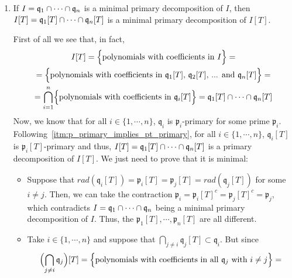 \begin{problem}
\begin{enumerate}[label=(\theproblem.\arabic*),ref=\theproblem.\arabic*]
        \item If $I = \mathfrak{q}_1 \cap \cdots \cap \mathfrak{q}_n$ is a minimal primary decomposition of $I$, then $I[T] = \mathfrak{q}_1[T] \cap \cdots \cap \mathfrak{q}_n[T]$ is a minimal primary decomposition of $I[T]$.
        \begin{sol}
            First of all we see that, in fact,
            \begin{gather*}
                I[T] = \Bigl\{ \text{polynomials with coefficients in } I \Bigr\} =\\
                = \Bigl\{ \text{polynomials with coefficients in } \mathfrak{q}_1[T] \text{, } \mathfrak{q}_2[T] \text{, ... and } \mathfrak{q}_n[T] \Bigr\} =\\
                = \bigcap_{i=1}^n \Bigl\{ \text{polynomials with coefficients in } \mathfrak{q}_i[T] \Bigr\} = \mathfrak{q}_1[T] \cap \cdots \cap \mathfrak{q}_n[T]\\
            \end{gather*}
            Now, we know that for all $i \in \{ 1, \cdots, n \}$, $\mathfrak{q}_i$ is $\mathfrak{p}_i$-primary for some prime $\mathfrak{p}_i$.
            Following~\ref{itm:p_primary_implies_pt_primary}, for all $i \in \{ 1, \cdots, n \}$, $\mathfrak{q}_i[T]$ is $\mathfrak{p}_i[T]$-primary and thus, $I[T] = \mathfrak{q}_1[T] \cap \cdots \cap \mathfrak{q}_n[T]$ is a primary decomposition of $I[T]$.
            We just need to prove that it is minimal:
            \begin{itemize}
                \item
                Suppose that $rad(\mathfrak{q}_i[T]) = \mathfrak{p}_i[T] = \mathfrak{p}_j[T] = rad(\mathfrak{q}_j[T])$ for some $i \neq j$.
                Then, we can take the contraction $\mathfrak{p}_i = \mathfrak{p}_i[T]^c = \mathfrak{p}_j[T]^c = \mathfrak{p}_j$, which contradicts $I = \mathfrak{q}_1 \cap \cdots \cap \mathfrak{q}_n$ being a minimal primary decomposition of $I$.
                Thus, the $\mathfrak{p}_1[T], \cdots, \mathfrak{p}_n[T]$ are all different.
                \item
                Take $i \in \{ 1, \cdots, n \}$ and suppose that $\bigcap_{j \neq i} \mathfrak{q}_j[T] \subset \mathfrak{q}_i$.
                But since
                \begin{gather*}
                    \Bigl( \bigcap_{j \neq i} \mathfrak{q}_j \Bigr)[T] = \Bigl\{ \text{polynomials with coefficients in all } \mathfrak{q}_j \text{ with } i \neq j \Bigr\} =\\

\end{gather*}
\end{itemize}
\end{sol}
\end{enumerate}
\end{problem}
